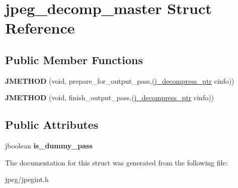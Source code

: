 \hypertarget{structjpeg__decomp__master}{}\section{jpeg\+\_\+decomp\+\_\+master Struct Reference}
\label{structjpeg__decomp__master}
\subsection*{Public Member Functions}
\begin{DoxyCompactItemize}
\item 
{\bfseries J\+M\+E\+T\+H\+OD} (void, prepare\+\_\+for\+\_\+output\+\_\+pass,(\hyperlink{structjpeg__decompress__struct}{j\+\_\+decompress\+\_\+ptr} cinfo))\hypertarget{structjpeg__decomp__master_ab0e51667ba436fad82e7cf95b1bd4120}{}\label{structjpeg__decomp__master_ab0e51667ba436fad82e7cf95b1bd4120}

\item 
{\bfseries J\+M\+E\+T\+H\+OD} (void, finish\+\_\+output\+\_\+pass,(\hyperlink{structjpeg__decompress__struct}{j\+\_\+decompress\+\_\+ptr} cinfo))\hypertarget{structjpeg__decomp__master_a7dec615b828e443ddddf99078d1edb9a}{}\label{structjpeg__decomp__master_a7dec615b828e443ddddf99078d1edb9a}

\end{DoxyCompactItemize}
\subsection*{Public Attributes}
\begin{DoxyCompactItemize}
\item 
jboolean {\bfseries is\+\_\+dummy\+\_\+pass}\hypertarget{structjpeg__decomp__master_a14f1f74071f696f58fad164a2dd1f326}{}\label{structjpeg__decomp__master_a14f1f74071f696f58fad164a2dd1f326}

\end{DoxyCompactItemize}


The documentation for this struct was generated from the following file\+:\begin{DoxyCompactItemize}
\item 
jpeg/jpegint.\+h\end{DoxyCompactItemize}

